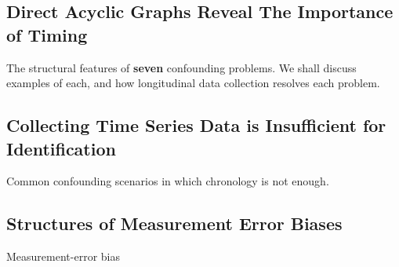 \documentclass[
  single column]{article}
\begin{document}
\newpage{}

\subsection{Direct Acyclic Graphs Reveal The Importance of
Timing}\label{direct-acyclic-graphs-reveal-the-importance-of-timing}

\begin{table}

\caption{\label{tbl-elementary-chronological-hyg}}

\centering{

\captionsetup{labelsep=none}

\terminologychronologicalhygeine

}

\end{table}%

The structural features of \textbf{seven} confounding problems. We shall
discuss examples of each, and how longitudinal data collection resolves
each problem.

\newpage{}

\subsection{Collecting Time Series Data is Insufficient for
Identification}\label{collecting-time-series-data-is-insufficient-for-identification}

\begin{table}

\caption{\label{tbl-chronology-notenough}Common confounding scenarios in
which chronology is not enough.}

\centering{

\terminologychronologicalhygeineNOTENOUGH

}

\end{table}%

\newpage{}

\subsection{Structures of Measurement Error
Biases}\label{structures-of-measurement-error-biases}

\begin{table}

\caption{\label{tbl-measurement-error}Measurement-error bias}

\centering{

\terminologymeasurementerror

}

\end{table}%
\end{document}

